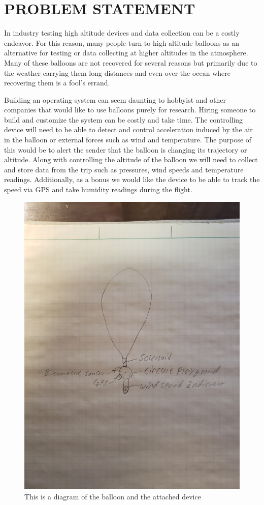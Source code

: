 \documentclass[12pt]{article}
\begin{document}


\section{PROBLEM STATEMENT}
In industry testing high altitude devices and data collection can be a costly endeavor. For this reason, many people turn to high altitude balloons as an alternative for testing or data collecting at higher altitudes in the atmosphere. Many of these balloons are not recovered for several reasons but primarily due to the weather carrying them long distances and even over the ocean where recovering them is a fool’s errand.  

Building an operating system can seem daunting to hobbyist and other companies that would like to use balloons purely for research. Hiring someone to build and customize the system can be costly and take time. The controlling device will need to be able to detect and control acceleration induced by the air in the balloon or external forces such as wind and temperature. The purpose of this would be to alert the sender that the balloon is changing its trajectory or altitude. Along with controlling the altitude of the balloon we will need to collect and store data from the trip such as pressures, wind speeds and temperature readings. Additionally, as a bonus we would like the device to be able to track the speed via GPS and take humidity readings during the flight. 

\begin{figure}[!t]
\centering
\includegraphics[width=3 in]{20211001_221557 (1).jpg}
\caption{This is a diagram of the balloon and the attached device \cite{Figure1}}
\label{fig:cpx}
\end{figure}
\end{document}
